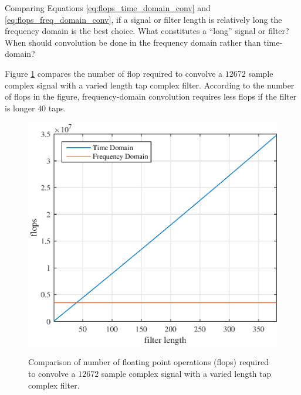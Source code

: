 Comparing Equations \eqref{eq:flops_time_domain_conv} and \ref{eq:flops_freq_domain_conv}, if a signal or filter length is relatively long the frequency domain is the best choice.
What constitutes a ``long'' signal or filter?
When should convolution be done in the frequency domain rather than time-domain?

Figure \ref{fig:Theory12672signal_flops} compares the number of flop required to convolve a $12672$ sample complex signal with a varied length tap complex filter.
According to the number of flops in the figure, frequency-domain convolution requires less flops if the filter is longer $40$ taps.
\begin{figure}
	\centering\includegraphics[width=5in]{figures/gpu_intro/Theory12672signal_flops.eps}
	\label{fig:Theory12672signal_flops}
	\caption{Comparison of number of floating point operations (flops) required to convolve a $12672$ sample complex signal with a varied length tap complex filter.}
\end{figure}


